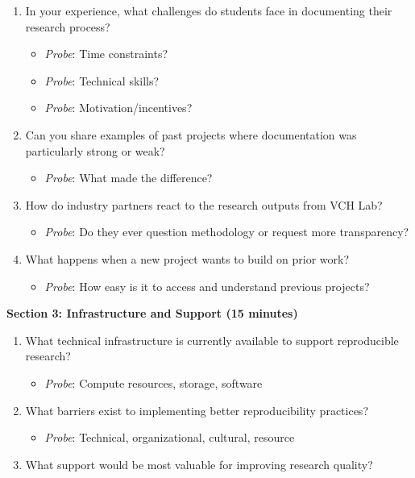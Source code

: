 \documentclass[
  oneside,
  open=any]{scrbook}
\providecommand{\tightlist}{%
  \setlength{\itemsep}{0pt}\setlength{\parskip}{0pt}}\usepackage{longtable,booktabs,array}
\begin{document}
\begin{enumerate}
\def\labelenumi{\arabic{enumi}.}
\setcounter{enumi}{4}
\tightlist
\item
  In your experience, what challenges do students face in documenting
  their research process?

  \begin{itemize}
  \tightlist
  \item
    \emph{Probe}: Time constraints?
  \item
    \emph{Probe}: Technical skills?
  \item
    \emph{Probe}: Motivation/incentives?
  \end{itemize}
\item
  Can you share examples of past projects where documentation was
  particularly strong or weak?

  \begin{itemize}
  \tightlist
  \item
    \emph{Probe}: What made the difference?
  \end{itemize}
\item
  How do industry partners react to the research outputs from VCH Lab?

  \begin{itemize}
  \tightlist
  \item
    \emph{Probe}: Do they ever question methodology or request more
    transparency?
  \end{itemize}
\item
  What happens when a new project wants to build on prior work?

  \begin{itemize}
  \tightlist
  \item
    \emph{Probe}: How easy is it to access and understand previous
    projects?
  \end{itemize}
\end{enumerate}

\textbf{Section 3: Infrastructure and Support (15 minutes)}

\begin{enumerate}
\def\labelenumi{\arabic{enumi}.}
\setcounter{enumi}{8}
\tightlist
\item
  What technical infrastructure is currently available to support
  reproducible research?

  \begin{itemize}
  \tightlist
  \item
    \emph{Probe}: Compute resources, storage, software
  \end{itemize}
\item
  What barriers exist to implementing better reproducibility practices?

  \begin{itemize}
  \tightlist
  \item
    \emph{Probe}: Technical, organizational, cultural, resource
  \end{itemize}
\item
  What support would be most valuable for improving research quality?
\end{enumerate}
\end{document}
